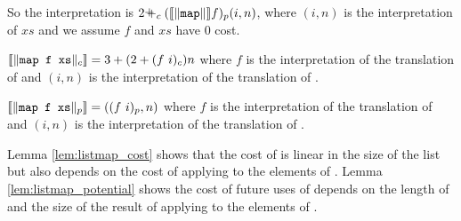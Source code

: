 So the interpretation is $2 \pplus_c (\LB\|\T{map}\|\RB f)_p (i,n)$,
where $(i,n)$ is the interpretation of $xs$ and we assume $f$ and $xs$ have $0$
cost.
%
\begin{lemma}
  \label{lem:listmap_cost}
  $\LB\|\T{map f xs}\|_c\RB = 3 + (2 + (f\ i)_c)n$ where $f$ is the
  interpretation of the translation of  and $(i,n)$ is the interpretation
  of the translation of .
\end{lemma}
%
\begin{lemma}
  \label{lem:listmap_potential}
  $\llbracket\|\texttt{map f xs}\|_p\rrbracket = ((f\ i)_p,n)$ where $f$ is the
  interpretation of the translation of  and $(i,n)$ is the interpretation
  of the translation of .
\end{lemma}
%
Lemma \ref{lem:listmap_cost} shows that the cost of  is linear in
the size of the list but also depends on the cost of applying  to the
elements of . Lemma \ref{lem:listmap_potential} shows the cost of future
uses of  depends on the length of  and the size of the result
of applying  to the elements of .
